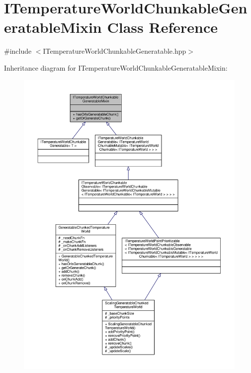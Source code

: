 \hypertarget{class_i_temperature_world_chunkable_generatable_mixin}{\section{I\-Temperature\-World\-Chunkable\-Generatable\-Mixin Class Reference}
\label{class_i_temperature_world_chunkable_generatable_mixin}
}


{\ttfamily \#include $<$I\-Temperature\-World\-Chunkable\-Generatable.\-hpp$>$}



Inheritance diagram for I\-Temperature\-World\-Chunkable\-Generatable\-Mixin\-:
\nopagebreak
\begin{figure}[H]
\begin{center}
\leavevmode
\includegraphics[width=350pt]{class_i_temperature_world_chunkable_generatable_mixin__inherit__graph}
\end{center}
\end{figure}



